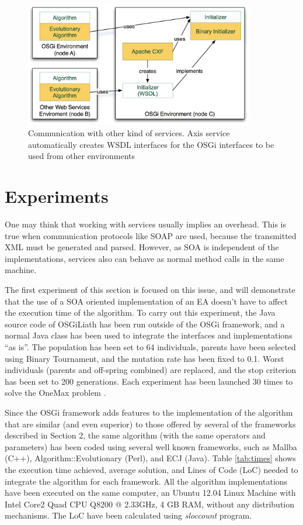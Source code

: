 \begin{figure}
\centering
\includegraphics[width=10cm]{gfx/osgiliath/axis.png}


\caption{Communication with other kind of services. Axis service automatically creates WSDL interfaces for the OSGi interfaces to be used from other environments}
\label{AXISFIGURE}
\end{figure}

\section{Experiments}
One may think that working with services usually implies an overhead. This is true when communication protocols like SOAP are used, because the transmitted XML must be generated and parsed. However, as SOA is independent of the implementations, services also can behave as normal method calls in the same machine.


The first experiment of this section is focused on this issue, and will demonstrate that the use of a SOA oriented implementation of an EA doesn't have to affect the execution time of the algorithm. To carry out this experiment, the Java source code of OSGiLiath has been run outside of the OSGi framework, and a normal Java class has been used to integrate the interfaces and implementations ``as is''. The population has been set to 64 individuals, parents have been selected using Binary Tournament, and the mutation rate has been fixed to 0.1. Worst individuals (parents and off-spring combined) are replaced, and the stop criterion has been set to 200 generations. Each experiment has been launched 30 times to solve the OneMax problem \cite{SchafferOnemax91}.



Since the OSGi framework adds features to the implementation of the algorithm that are similar (and even superior) to those offered by several of the frameworks described in Section 2, the same algorithm (with the same operators and parameters) has been coded using several well known frameworks, such as Mallba (C++), Algorithm::Evolutionary (Perl), and ECJ (Java). Table \ref{tab:times} shows the execution time achieved, average solution, and Lines of Code (LoC) needed to integrate the algorithm for each framework. All the algorithm implementations have been executed on the same computer, an Ubuntu 12.04 Linux Machine with Intel Core2 Quad CPU Q8200 @ 2.33GHz, 4 GB RAM, without any distribution mechanisms. The LoC have been calculated using {\em sloccount} program.






